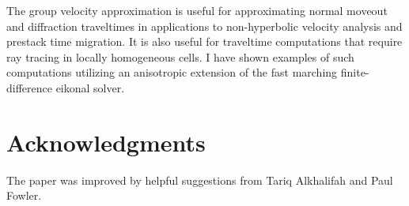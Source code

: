 The group velocity approximation is useful for approximating normal moveout
and diffraction traveltimes in applications to non-hyperbolic velocity
analysis and prestack time migration. It is also useful for traveltime
computations that require ray tracing in locally homogeneous cells. I have
shown examples of such computations utilizing an anisotropic extension of the
fast marching finite-difference eikonal solver.


\section{Acknowledgments}

The paper was improved by helpful suggestions from Tariq Alkhalifah and Paul
Fowler.





%
%
